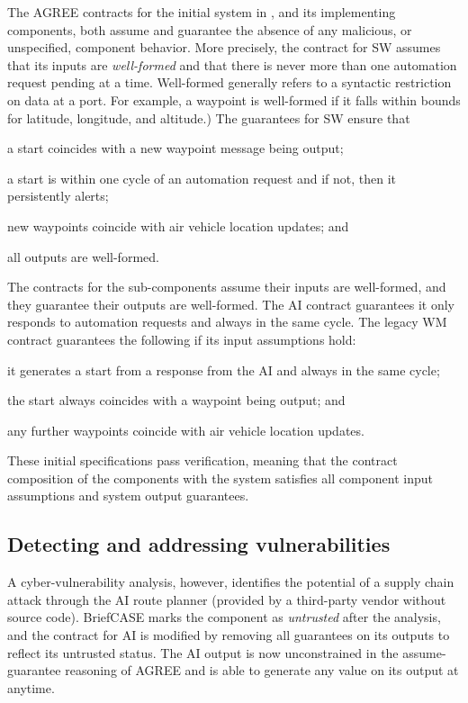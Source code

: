 The AGREE contracts for the initial system in ,
and its implementing components, both assume and guarantee the absence
of any malicious, or unspecified, component behavior.  More precisely,
the contract for SW assumes that its inputs are \emph{well-formed} and that
there is never more than one automation request pending at a time.
Well-formed generally refers to a syntactic restriction on
data at a port. For example, a waypoint is well-formed if it falls
within bounds for latitude, longitude, and altitude.)  The guarantees
for SW ensure that
\begin{compactitem}
\item a start coincides with a new waypoint message being output;
\item a start is within one cycle of an automation request and if not, then it persistently alerts;
\item new waypoints coincide with air vehicle location updates; and
\item all outputs are well-formed.
\end{compactitem}

The contracts for the sub-components assume their inputs are
well-formed, and they guarantee their outputs are well-formed.  The AI
contract guarantees it only responds to automation requests and always
in the same cycle.  The legacy WM contract guarantees the following if
its input assumptions hold:
\begin{compactitem}
  \item it generates a start from a response from the AI and always in the same cycle;
  \item the start always coincides with a waypoint being output; and
  \item any further waypoints coincide with air vehicle location updates.
\end{compactitem}
These initial specifications pass verification, meaning that the
contract composition of the components with the system satisfies all
component input assumptions and system output guarantees.

\subsection{Detecting and addressing vulnerabilities}
A cyber-vulnerability analysis, however, identifies the potential of a
supply chain attack through the AI route planner (provided by a
third-party vendor without source code).  BriefCASE marks the
component as \emph{untrusted} after the analysis, and the contract for
AI is modified by removing all guarantees on its outputs to reflect
its untrusted status.  The AI output is now unconstrained in the
assume-guarantee reasoning of AGREE and is able to generate any value
on its output at anytime.

